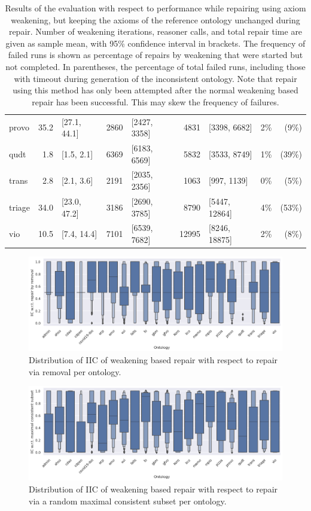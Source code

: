 \begin{table}[htbp]
\begin{tabular}{|l|r@{ }lr@{ }lr@{ }lr@{ }r|}
    provo & 35.2 & [27.1, 44.1] & 2860 & [2427, 3358] & 4831 & [3398, 6682] & 2\% & (9\%) \\
    qudt & 1.8 & [1.5, 2.1] & 6369 & [6183, 6569] & 5832 & [3533, 8749] & 1\% & (39\%) \\
    trans & 2.8 & [2.1, 3.6] & 2191 & [2035, 2356] & 1063 & [997, 1139] & 0\% & (5\%) \\
    triage & 34.0 & [23.0, 47.2] & 3186 & [2690, 3785] & 8790 & [5447, 12864] & 4\% & (53\%) \\
    vio & 10.5 & [7.4, 14.4] & 7101 & [6539, 7682] & 12995 & [8246, 18875] & 2\% & (8\%) \\
    \hline
  \end{tabular}
  \caption{Results of the evaluation with respect to performance while repairing using axiom weakening, but keeping the axioms of the reference ontology unchanged during repair. Number of weakening iterations, reasoner calls, and total repair time are given as sample mean, with 95\% confidence interval in brackets. The frequency of failed runs is shown as percentage of repairs by weakening that were started but not completed. In parentheses, the percentage of total failed runs, including those with timeout during generation of the inconsistent ontology. Note that repair using this method has only been attempted after the normal weakening based repair has been successful. This may skew the frequency of failures.}
\end{table}

\iffalse

\begin{figure}[htbp]
  \centering
  \includegraphics[width=\textwidth]{resources/iic-remove-ontology-violin.png}
  \caption{Distribution of IIC of weakening based repair with respect to repair via removal per ontology.}
\end{figure}

\begin{figure}[htbp]
  \centering
  \includegraphics[width=\textwidth]{resources/iic-mcs-ontology-violin.png}
  \caption{Distribution of IIC of weakening based repair with respect to repair via a random maximal consistent subset per ontology.}
\end{figure}

